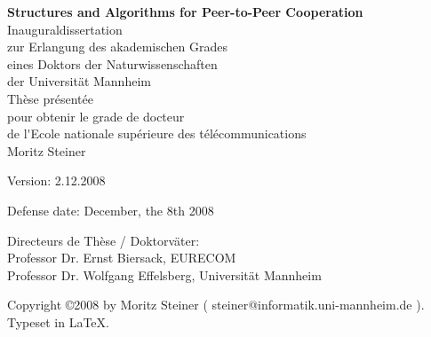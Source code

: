 \begin{titlepage}
  \begin{center}
    \vspace*{1cm}
    {\huge\bf Structures and Algorithms for Peer-to-Peer Cooperation\\
    }
    \vspace{3cm}
    {\large Inauguraldissertation\\ zur Erlangung des akademischen
Grades\\ eines Doktors der Naturwissenschaften\\ der Universit\"at
Mannheim \\ \vspace{1cm}  Th\`ese pr\'esent\'ee \\pour obtenir le
grade de docteur \\de l\'{}Ecole nationale sup\'erieure des
t\'el\'ecommunications\\
     \vspace{3cm}
           {\huge Moritz Steiner}\\
    }
  \end{center}

\vspace*{2,5cm}
Version: 2.12.2008

Defense date: December, the 8th 2008 \\

\vspace*{1cm}

Directeurs de Th\`ese / Doktorv\"ater:\\
Professor Dr. Ernst Biersack,  EURECOM \\
Professor Dr. Wolfgang Effelsberg, Universit\"at Mannheim



\clearpage

\vspace*{22cm}
Copyright \copyright 2008 by Moritz Steiner ( steiner@informatik.uni-mannheim.de ). \\
Typeset in \LaTeX .

\end{titlepage}
